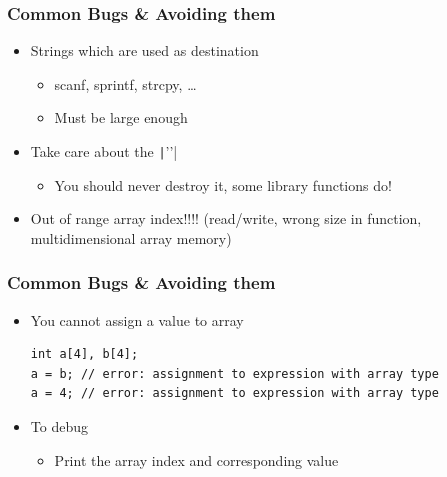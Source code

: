 \documentclass{../c-lecture}
\begin{document}
\begin{frame}
  \frametitle{Common Bugs \& Avoiding them}
  \begin{itemize}
    \item Strings which are used as destination
    \begin{itemize}
      \item scanf, sprintf, strcpy, \ldots
      \item Must be large enough
    \end{itemize}
    \item Take care about the \texttt|'\0'|
    \begin{itemize}
      \item You should never destroy it, some library functions do!
    \end{itemize}
    \item
      Out of range array index!!!! (read/write, wrong size in function,
      multidimensional array memory)
  \end{itemize}
\end{frame}

\begin{frame}[fragile]
  \frametitle{Common Bugs \& Avoiding them}
  \begin{itemize}
    \item You cannot assign a value to array
    \scriptsize
    \begin{verbatim}
int a[4], b[4];
a = b; // error: assignment to expression with array type
a = 4; // error: assignment to expression with array type
    \end{verbatim}
    \normalsize
    \item To debug
    \begin{itemize}
      \item Print the array index and corresponding value
    \end{itemize}
  \end{itemize}
\end{frame}
\end{document}

